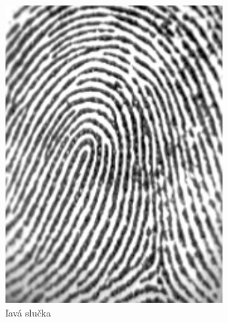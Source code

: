 \begin{figure}[h]
\begin{subfigure}[b]{0.19\linewidth}
      \includegraphics[width=\linewidth]{obrazky-figures/lava_slucka.png}
      \caption{ľavá slučka}
      \label{obr:triedy_odtlackov/lava_slucka}
    \end{subfigure}
    \hfill
    \begin{subfigure}[b]{0.19\linewidth}

\end{subfigure}
\end{figure}
